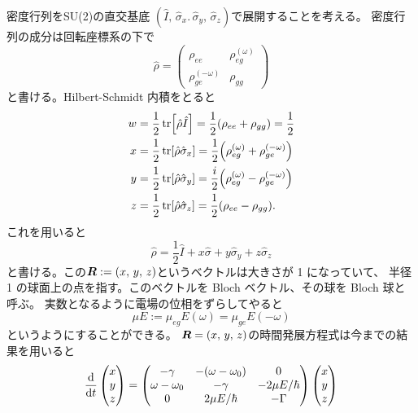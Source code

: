 \documentclass[11pt,dvipdfmx,a4paper]{jsarticle}
\begin{document}
密度行列をSU(2)の直交基底
\((\hat{I},\,\hat{\sigma}_x.\,\hat{\sigma}_y,\,\hat{\sigma}_z)\)で展開することを考える。
密度行列の成分は回転座標系の下で
\begin{equation}
	\hat{\rho} =
	\begin{pmatrix}
		\rho_{ee} & \rho_{eg}^{(\omega)}\\
		\rho_{ge}^{(-\omega)} & \rho_{gg}
	\end{pmatrix}
\end{equation}
と書ける。Hilbert-Schmidt 内積をとると
\begin{align}
	w &=\frac{1}{2} \tr [\hat{\rho}\hat{I}]
	= \frac{1}{2}\qty(\rho_{ee}+\rho_{gg}) = \frac{1}{2}\\
	x &=\frac{1}{2} \tr [\hat{\rho}\hat{\sigma}_x]
	= \frac{1}{2}\qty(\rho_{eg}^{(\omega)}+\rho_{ge}^{(-\omega)})\\
	y &=\frac{1}{2} \tr [\hat{\rho}\hat{\sigma}_y]
	= \frac{i}{2}\qty(\rho_{eg}^{(\omega)}-\rho_{ge}^{(-\omega)})\\
	z &=\frac{1}{2} \tr [\hat{\rho}\hat{\sigma}_z]
	= \frac{1}{2}\qty(\rho_{ee}-\rho_{gg}).
\end{align}
これを用いると
\begin{equation}
	\hat{\rho} = \frac{1}{2}\hat{I}+x\hat{\sigma}+y\hat{\sigma}_y+z\hat{\sigma}_z
\end{equation}
と書ける。この\(\vb*{R} := (x,\,y,\,z)\)というベクトルは大きさが 1 になっていて、
半径 1 の球面上の点を指す。このベクトルを Bloch ベクトル、その球を Bloch 球と呼ぶ。
実数となるように電場の位相をずらしてやると
\begin{equation}
	\mu E := \mu_{eg}E(\omega) = \mu_{ge}E(-\omega)
\end{equation}
というようにすることができる。
\(\vb*{R} = (x,\,y,\,z)\)の時間発展方程式は今までの結果を用いると
\begin{equation}
	\dv{t}
	\begin{pmatrix}
		x\\ y\\ z
	\end{pmatrix}
	=
	\begin{pmatrix}
		-\gamma & -(\omega-\omega_0) & 0\\
		\omega -\omega_0 & -\gamma & -2\mu E/\hbar\\
		0 & 2\mu E/\hbar & -\Gamma
	\end{pmatrix}
	\begin{pmatrix}
		x\\ y\\ z
	\end{pmatrix}
\end{equation}
\end{document}
